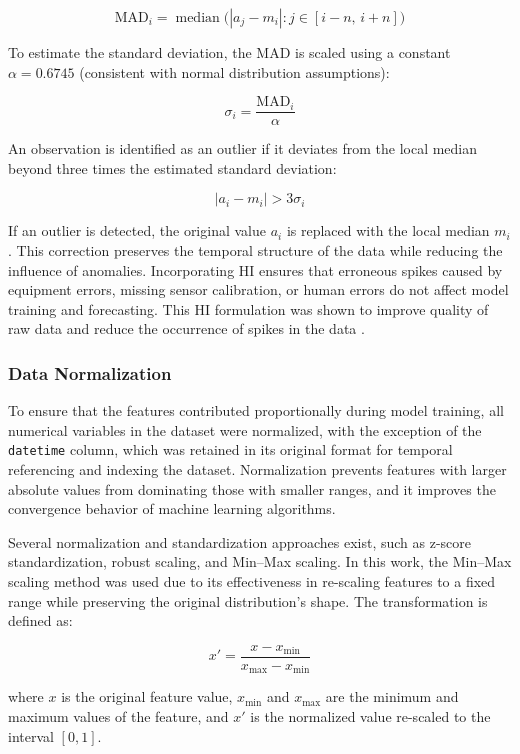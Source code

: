 \[
\mathrm{MAD}_i = \operatorname{median}\big(|a_{j} - m_i| : j \in [i-n,\, i+n]\big)
\]

To estimate the standard deviation, the MAD is scaled using a constant \(\alpha = 0.6745\) (consistent with normal distribution assumptions):

\[
\sigma_i = \frac{\mathrm{MAD}_i}{\alpha}
\]

An observation is identified as an outlier if it deviates from the local median beyond three times the estimated standard deviation:

\[
|a_i - m_i| > 3\sigma_i
\]

If an outlier is detected, the original value \(a_i\) is replaced with the local median \(m_i\). This correction preserves the temporal structure of the data while reducing the influence of anomalies. Incorporating HI ensures that erroneous spikes caused by equipment errors, missing sensor calibration, or human errors do not affect model training and forecasting. This HI formulation was shown to improve quality of raw data and reduce the occurrence of spikes in the data \cite{hiceemdanQteg}.

\subsubsection{Data Normalization}

To ensure that the features contributed proportionally during model training, all numerical variables in the dataset were normalized, with the exception of the \texttt{datetime} column, which was retained in its original format for temporal referencing and indexing the dataset. Normalization prevents features with larger absolute values from dominating those with smaller ranges, and it improves the convergence behavior of machine learning algorithms.

Several normalization and standardization approaches exist, such as z-score standardization, robust scaling, and Min–Max scaling. In this work, the Min–Max scaling method was used due to its effectiveness in re-scaling features to a fixed range while preserving the original distribution’s shape. The transformation is defined as:

\[
x' = \frac{x - x_{\min}}{x_{\max} - x_{\min}}
\]

where \(x\) is the original feature value, \(x_{\min}\) and \(x_{\max}\) are the minimum and maximum values of the feature, and \(x'\) is the normalized value re-scaled to the interval \([0,1]\).


